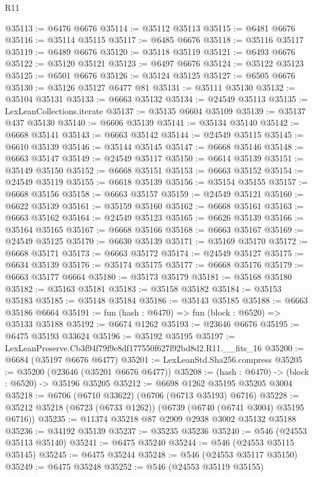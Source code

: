 \begin{lexlean}{R11}
\begin{coremodule}
@35113 := @6476 @6676
@35114 := @35112 @35113
@35115 := @6481 @6676
@35116 := @35114 @35115
@35117 := @6485 @6676
@35118 := @35116 @35117
@35119 := @6489 @6676
@35120 := @35118 @35119
@35121 := @6493 @6676
@35122 := @35120 @35121
@35123 := @6497 @6676
@35124 := @35122 @35123
@35125 := @6501 @6676
@35126 := @35124 @35125
@35127 := @6505 @6676
@35130 := @35126 @35127 @6477 @81
@35131 := @35111 @35130
@35132 := @35104 @35131
@35133 := @6663 @35132
@35134 := @24549 @35113
@35135 := LexLeanCollections.iterate
@35137 := @35135 @6604 @35109
@35139 := @35137 @437 @35130
@35140 := @6606 @35139
@35141 := @35134 @35140
@35142 := @6668 @35141
@35143 := @6663 @35142
@35144 := @24549 @35115
@35145 := @6610 @35139
@35146 := @35144 @35145
@35147 := @6668 @35146
@35148 := @6663 @35147
@35149 := @24549 @35117
@35150 := @6614 @35139
@35151 := @35149 @35150
@35152 := @6668 @35151
@35153 := @6663 @35152
@35154 := @24549 @35119
@35155 := @6618 @35139
@35156 := @35154 @35155
@35157 := @6668 @35156
@35158 := @6663 @35157
@35159 := @24549 @35121
@35160 := @6622 @35139
@35161 := @35159 @35160
@35162 := @6668 @35161
@35163 := @6663 @35162
@35164 := @24549 @35123
@35165 := @6626 @35139
@35166 := @35164 @35165
@35167 := @6668 @35166
@35168 := @6663 @35167
@35169 := @24549 @35125
@35170 := @6630 @35139
@35171 := @35169 @35170
@35172 := @6668 @35171
@35173 := @6663 @35172
@35174 := @24549 @35127
@35175 := @6634 @35139
@35176 := @35174 @35175
@35177 := @6668 @35176
@35179 := @6663 @35177 @6664
@35180 := @35173 @35179
@35181 := @35168 @35180
@35182 := @35163 @35181
@35183 := @35158 @35182
@35184 := @35153 @35183
@35185 := @35148 @35184
@35186 := @35143 @35185
@35188 := @6663 @35186 @6664
@35191 := fun (hash : @6470) => fun (block : @6520) => @35133 @35188
@35192 := @6674 @1262
@35193 := @23646 @6676
@35195 := @6475 @35193 @33624
@35196 := @35192 @35195
@35197 := LexLeanPreserve.Cb3f94f79f9e8df177550f627f92bd8d2.R11.__fits_16
@35200 := @6684 (@35197 @6676 @6477)
@35201 := LexLeanStd.Sha256.compress
@35205 := @35200 (@23646 (@35201 @6676 @6477))
@35208 := (hash : @6470) -> (block : @6520) -> @35196 @35205
@35212 := @6698 @1262 @35195 @35205 @3004
@35218 := @6706 (@6710 @33622) (@6706 (@6713 @35193) @6716)
@35228 := @35212 @35218 (@6723 (@6733 @1262)) (@6739 (@6740 (@6741 @3004) @35195 @6716))
@35235 := @11374 @35218 @87 @2909 @2938 @3002 @35132 @35188
@35236 := @34192 @35139
@35237 := @35235 @35236
@35240 := @546 (@24553 @35113 @35140)
@35241 := @6475 @35240
@35244 := @546 (@24553 @35115 @35145)
@35245 := @6475 @35244
@35248 := @546 (@24553 @35117 @35150)
@35249 := @6475 @35248
@35252 := @546 (@24553 @35119 @35155)

\end{coremodule}
\end{lexlean}
